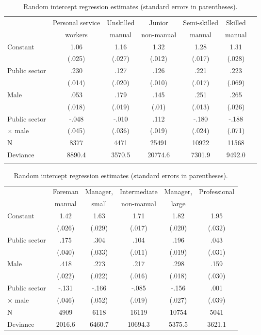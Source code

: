 \documentclass[a4paper,11pt,titlepage]{article}
\begin{document}
\begin{table}[tb]
\caption{Random intercept regression estimates (standard errors in parentheses).\label{tab:baseline}}
\begin{tabular}{lcccccc}
\toprule
            &Personal service   &Unskilled &Junior      &Semi-skilled   &Skilled \\
            & workers           &manual    &non-manual  & manual        &manual \\
\midrule
Constant	&1.06 	            &1.16 	   &1.32	  	  &1.28 	        &1.31\\
					&(.025)	            &(.027)	   &(.012)	    &(.017)	        &(.028)\\
Public sector&.230		        &.127	   	 &.126			  &.221				    &.223\\
					&(.014)	            &(.020)	   &(.010)	    &(.017)	        &(.069)\\
Male			&.053							  &.179			 &.145			  &.251					  &.265\\
					&(.018)							&(.019)		 &(.01)				&(.013)					&(.026)\\
Public sector & -.048					&-.010		 &.112			  &-.180					&-.188\\
\quad $\times$ male &(.045)		&(.036)		 &(.019)			&(.024)					&(.071)\\
\midrule
N					&8377  	            &4471  	   &25491       &10922 	        &11568    \\
Deviance	&8890.4	            &3570.5	   &20774.6     &7301.9	        &9492.0\\
\\
\bottomrule
\end{tabular}

\begin{tabular}{lccccc}
\\
\toprule
			&Foreman            & Manager, &Intermediate&Manager,       &Professional\\
			&manual             & small    & non-manual	& large \\
\midrule
Constant	&1.42	            &1.63	   	 &1.71	   	  &1.82	        	&1.95\\
					&(.026)	          &(.029)	   &(.017)	    &(.020)	        &(.032)\\
Public sector&.175 	        &.304      &.104     		&.196 	        &.043\\
            &(.040)         &(.033)	   &(.011)	    &(.019)	        &(.031)\\
Male				&.418						&.273			 &.217				&.298					  &.159\\
						&(.022)					&(.022)		 &(.016)			&(.018)					&(.030)\\
Public sector &-.131				&-.166		 &-.085			  &-.156					&.001\\
\quad $\times$ male&(.046)  &(.052)		 &(.019)			&(.027)					&(.039)\\
\midrule
N 		  	&4909              	&6118      &16119    	&10754          &5041\\
Deviance	&2016.6	            &6460.7	   &10694.3     &5375.5         &3621.1 \\
\bottomrule
\end{tabular}
\end{table}
\end{document}
